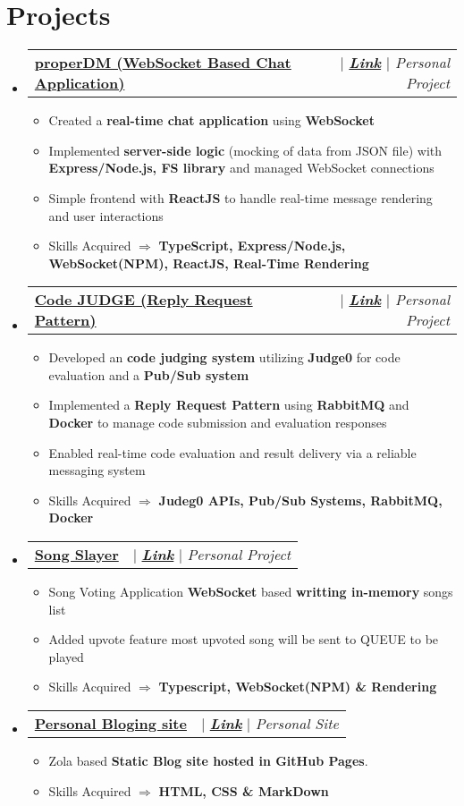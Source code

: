 \documentclass[letterpaper,11pt]{article}
\makeatletter
\newcommand{\resumeItem}[1]{
  \item\small{
    {#1 \vspace{-2pt}}
  }
}
\newcommand{\resumeProjectHeading}[2]{
    \item
    \begin{tabular*}{0.97\textwidth}{l@{\extracolsep{\fill}}r}
      \small#1 & #2 \\
    \end{tabular*}\vspace{-7pt}
}
\newcommand{\resumeSubHeadingListStart}{\begin{itemize}[leftmargin=0.15in, label={}]}
\newcommand{\resumeSubHeadingListEnd}{\end{itemize}}
\newcommand{\resumeItemListStart}{\begin{itemize}}
\newcommand{\resumeItemListEnd}{\end{itemize}\vspace{-5pt}}
\makeatother
\begin{document}
\section{Projects}
    \resumeSubHeadingListStart
      \resumeProjectHeading
          {\href{https://github.com/adityadeshlahre/properDM}{\textbf{properDM (WebSocket Based Chat Application)}}}
          {{ $|$ \emph{\href{https://github.com/adityadeshlahre/properDM}{\textbf{Link}} $|$ Personal Project}}}
          \resumeItemListStart
                \resumeItem{Created a \textbf{real-time chat application} using \textbf{WebSocket}}
                \resumeItem{Implemented \textbf{server-side logic} (mocking of data from JSON file) with \textbf{Express/Node.js, FS library} and managed WebSocket connections}
                \resumeItem{Simple frontend with \textbf{ReactJS} to handle real-time message rendering and user interactions}
                \resumeItem{Skills Acquired $\Longrightarrow$ \textbf{TypeScript, Express/Node.js, WebSocket(NPM), ReactJS, Real-Time Rendering}}
            \resumeItemListEnd
      \resumeProjectHeading
          {\href{https://github.com/adityadeshlahre/rabbitMQ-RPC} {\textbf{Code JUDGE (Reply Request Pattern)}}}
          {{ $|$ \emph{\href{https://github.com/adityadeshlahre/rabbitMQ-RPC}{\textbf{Link}} $|$ {Personal Project}}}}
          \resumeItemListStart
             \resumeItem{Developed an \textbf{ code judging system} utilizing \textbf{Judge0} for code evaluation and a \textbf{Pub/Sub system}}
             \resumeItem{Implemented a \textbf{Reply Request Pattern} using \textbf{RabbitMQ} and \textbf{Docker} to manage code submission and evaluation responses}
             \resumeItem{Enabled real-time code evaluation and result delivery via a reliable messaging system}
             \resumeItem{Skills Acquired $\Longrightarrow$ \textbf{Judeg0 APIs, Pub/Sub Systems, RabbitMQ, Docker}}
           \resumeItemListEnd
      \resumeProjectHeading
          {\href{https://github.com/adityadeshlahre/songSlayer}{\textbf{Song Slayer}}}
          {{ $|$ \emph{\href{https://github.com/adityadeshlahre/songSlayer}{\textbf{Link}}}{ $|$ \emph{Personal Project}}}}
          \resumeItemListStart
            \resumeItem{Song Voting Application \textbf{WebSocket} based \textbf{writting in-memory} songs list}
            \resumeItem{Added upvote feature most upvoted song will be sent to QUEUE to be played}
            \resumeItem{Skills Acquired $\Longrightarrow$ \textbf{Typescript, WebSocket(NPM) \& Rendering}}
          \resumeItemListEnd
      \resumeProjectHeading
          {\href{https://adityadeshlahre.github.io/}{\textbf{Personal Bloging site}}}
          {{{ $|$ \emph{\href{https://github.com/adityadeshlahre/songSlayer}{\textbf{Link}}} $|$ \emph{Personal Site}}}}
          \resumeItemListStart
            \resumeItem{Zola based \textbf{Static Blog site hosted in GitHub Pages}.}
            \resumeItem{Skills Acquired $\Longrightarrow$ \textbf{HTML, CSS \& MarkDown}}
          \resumeItemListEnd
    \resumeSubHeadingListEnd
\end{document}
